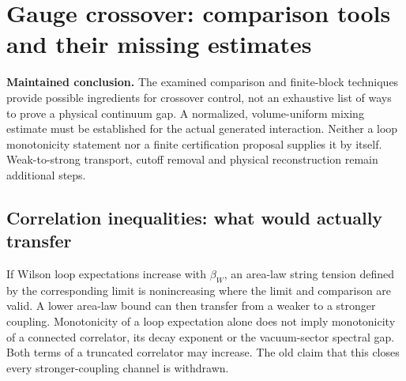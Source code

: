 \documentclass[11pt,a4paper]{article}
\begin{document}
\hypertarget{gauge-crossover-comparison-tools-and-their-missing-estimates}{%
\section{Gauge crossover: comparison tools and their missing
estimates}\label{gauge-crossover-comparison-tools-and-their-missing-estimates}}

\textbf{Maintained conclusion.} The examined comparison and finite-block
techniques provide possible ingredients for crossover control, not an
exhaustive list of ways to prove a physical continuum gap. A normalized,
volume-uniform mixing estimate must be established for the actual
generated interaction. Neither a loop monotonicity statement nor a
finite certification proposal supplies it by itself. Weak-to-strong
transport, cutoff removal and physical reconstruction remain additional
steps.

\hypertarget{correlation-inequalities-what-would-actually-transfer}{%
\subsection{Correlation inequalities: what would actually
transfer}\label{correlation-inequalities-what-would-actually-transfer}}

If Wilson loop expectations increase with \(\beta_W\), an area-law
string tension defined by the corresponding limit is nonincreasing where
the limit and comparison are valid. A lower area-law bound can then
transfer from a weaker to a stronger coupling. Monotonicity of a loop
expectation alone does not imply monotonicity of a connected correlator,
its decay exponent or the vacuum-sector spectral gap. Both terms of a
truncated correlator may increase. The old claim that this closes every
stronger-coupling channel is withdrawn.
\end{document}
